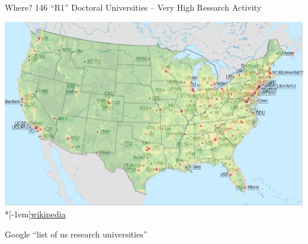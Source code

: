 \begin{frame}[fragile]{Where? 146 ``R1'' 
    Doctoral Universities – Very High Research Activity}
\begin{center}
\includegraphics[width=\textwidth]{r1map-density-overlay1}\\*[-1em]\hfill{\tiny \href{https://en.wikipedia.org/wiki/List_of_research_universities_in_the_United_States}{wikipedia}}

Google ``list of us research universities''


\end{center}
\end{frame}

